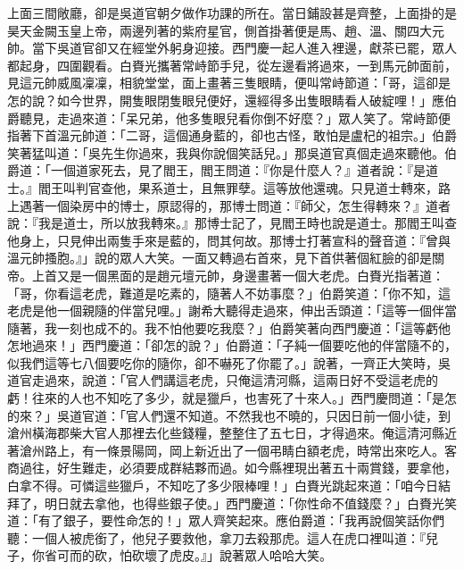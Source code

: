 上面三間敞廳，卻是吳道官朝夕做作功課的所在。當日鋪設甚是齊整，上面掛的是昊天金闕玉皇上帝，兩邊列著的紫府星官，側首掛著便是馬、趙、溫、關四大元帥。當下吳道官卻又在經堂外躬身迎接。西門慶一起人進入裡邊，獻茶已罷，眾人都起身，四圍觀看。白賚光攜著常峙節手兒，從左邊看將過來，一到馬元帥面前，見這元帥威風凜凜，相貌堂堂，面上畫著三隻眼睛，便叫常峙節道：「哥，這卻是怎的說？如今世界，開隻眼閉隻眼兒便好，還經得多出隻眼睛看人破綻哩！」應伯爵聽見，走過來道：「呆兄弟，他多隻眼兒看你倒不好麼？」眾人笑了。常峙節便指著下首溫元帥道：「二哥，這個通身藍的，卻也古怪，敢怕是盧杞的祖宗。」伯爵笑著猛叫道：「吳先生你過來，我與你說個笑話兒。」那吳道官真個走過來聽他。伯爵道：「一個道家死去，見了閻王，閻王問道：『你是什麼人？』道者說：『是道士。』閻王叫判官查他，果系道士，且無罪孽。這等放他還魂。只見道士轉來，路上遇著一個染房中的博士，原認得的，那博士問道：『師父，怎生得轉來？』道者說：『我是道士，所以放我轉來。』那博士記了，見閻王時也說是道士。那閻王叫查他身上，只見伸出兩隻手來是藍的，問其何故。那博士打著宣科的聲音道：『曾與溫元帥搔胞。』」說的眾人大笑。一面又轉過右首來，見下首供著個紅臉的卻是關帝。上首又是一個黑面的是趙元壇元帥，身邊畫著一個大老虎。白賚光指著道：「哥，你看這老虎，難道是吃素的，隨著人不妨事麼？」伯爵笑道：「你不知，這老虎是他一個親隨的伴當兒哩。」謝希大聽得走過來，伸出舌頭道：「這等一個伴當隨著，我一刻也成不的。我不怕他要吃我麼？」伯爵笑著向西門慶道：「這等虧他怎地過來！」西門慶道：「卻怎的說？」伯爵道：「子純一個要吃他的伴當隨不的，似我們這等七八個要吃你的隨你，卻不嚇死了你罷了。」說著，一齊正大笑時，吳道官走過來，說道：「官人們講這老虎，只俺這清河縣，這兩日好不受這老虎的虧！往來的人也不知吃了多少，就是獵戶，也害死了十來人。」西門慶問道：「是怎的來？」吳道官道：「官人們還不知道。不然我也不曉的，只因日前一個小徒，到滄州橫海郡柴大官人那裡去化些錢糧，整整住了五七日，才得過來。俺這清河縣近著滄州路上，有一條景陽岡，岡上新近出了一個弔睛白額老虎，時常出來吃人。客商過往，好生難走，必須要成群結夥而過。如今縣裡現出著五十兩賞錢，要拿他，白拿不得。可憐這些獵戶，不知吃了多少限棒哩！」白賚光跳起來道：「咱今日結拜了，明日就去拿他，也得些銀子使。」西門慶道：「你性命不值錢麼？」白賚光笑道：「有了銀子，要性命怎的！」眾人齊笑起來。應伯爵道：「我再說個笑話你們聽：一個人被虎銜了，他兒子要救他，拿刀去殺那虎。這人在虎口裡叫道：『兒子，你省可而的砍，怕砍壞了虎皮。』」說著眾人哈哈大笑。

